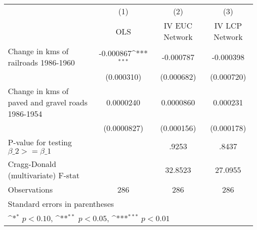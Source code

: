 {
\def\sym#1{\ifmmode^{#1}\else\(^{#1}\)\fi}
\begin{tabular}{l*{3}{c}}
\hline\hline
                &\multicolumn{1}{c}{(1)}&\multicolumn{1}{c}{(2)}&\multicolumn{1}{c}{(3)}\\
                &\multicolumn{1}{c}{OLS}&\multicolumn{1}{c}{IV EUC Network}&\multicolumn{1}{c}{IV LCP Network}\\
\hline
Change in kms of railroads 1986-1960&-0.000867\sym{***}&-0.000787         &-0.000398         \\
                &(0.000310)         &(0.000682)         &(0.000720)         \\
[1em]
Change in kms of paved and gravel roads 1986-1954&0.0000240         &0.0000860         & 0.000231         \\
                &(0.0000827)         &(0.000156)         &(0.000178)         \\
\hline
P-value for testing $\beta\_{2} >= \beta\_{1}$&                  &    .9253         &    .8437         \\
Cragg-Donald (multivariate) F-stat&                  &  32.8523         &  27.0955         \\
Observations    &      286         &      286         &      286         \\
\hline\hline
\multicolumn{4}{l}{\footnotesize Standard errors in parentheses}\\
\multicolumn{4}{l}{\footnotesize \sym{*} \(p<0.10\), \sym{**} \(p<0.05\), \sym{***} \(p<0.01\)}\\
\end{tabular}
}
